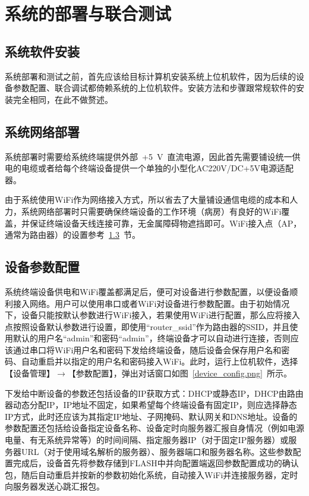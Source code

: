 
\chapter{系统的部署与联合测试}
\section{系统软件安装}
系统部署和测试之前，首先应该给目标计算机安装系统上位机软件，因为后续的设备参数配置、联合调试都倚赖系统的上位机软件。安装方法和步骤跟常规软件的安装完全相同，在此不做赘述。

\section{系统网络部署}
系统部署时需要给系统终端提供外部~+5~V~直流电源，因此首先需要铺设统一供电的电缆或者给每个终端设备提供一个单独的小型化AC220V/DC+5V电源适配器。

由于系统使用\acrshort{WiFi}作为网络接入方式，所以省去了大量铺设通信电缆的成本和人力，系统网络部署时只需要确保终端设备的工作环境（病房）有良好的\acrshort{WiFi}覆盖，并保证终端设备天线连接可靠，无金属障碍物遮挡即可。\acrshort{WiFi}接入点（AP，通常为路由器）的设置参考~\ref{sec:device_config}~节。

\section{设备参数配置}\label{sec:device_config}
系统终端设备供电和\acrshort{WiFi}覆盖都满足后，便可对设备进行参数配置，以便设备顺利接入网络。用户可以使用串口或者\acrshort{WiFi}对设备进行参数配置。由于初始情况下，设备只能按默认参数进行\acrshort{WiFi}接入，若果使用\acrshort{WiFi}进行配置，那么应将接入点按照设备默认参数进行设置，即使用“router{\_}ssid”作为路由器的SSID，并且使用默认的用户名“admin”和密码“admin”，终端设备才可以自动进行连接，否则应该通过串口将\acrshort{WiFi}用户名和密码下发给终端设备，随后设备会保存用户名和密码、自动重启并以指定的用户名和密码接入\acrshort{WiFi}。此时，运行上位机软件，选择【设备管理】$\rightarrow$【参数配置】，弹出对话窗口如图~\ref{device_config.png}~所示。

下发给中断设备的参数还包括设备的IP获取方式：DHCP或静态IP，DHCP由路由器动态分配IP，IP地址不固定，如果希望每个终端设备有固定IP，则应选择静态IP方式，此时还应该为其指定IP地址、子网掩码、默认网关和DNS地址。设备的参数配置还包括给设备指定设备名称、设备定时向服务器汇报自身情况（例如电源电量、有无系统异常等）的时间间隔、指定服务器IP（对于固定IP服务器）或服务器URL（对于使用域名解析的服务器）、服务器端口和服务器名称。这些参数配置完成后，设备首先将参数存储到FLASH中并向配置端返回参数配置成功的确认包，随后自动重启并按新的参数初始化系统，自动接入\acrshort{WiFi}并连接服务器，定时向服务器发送心跳汇报包。

